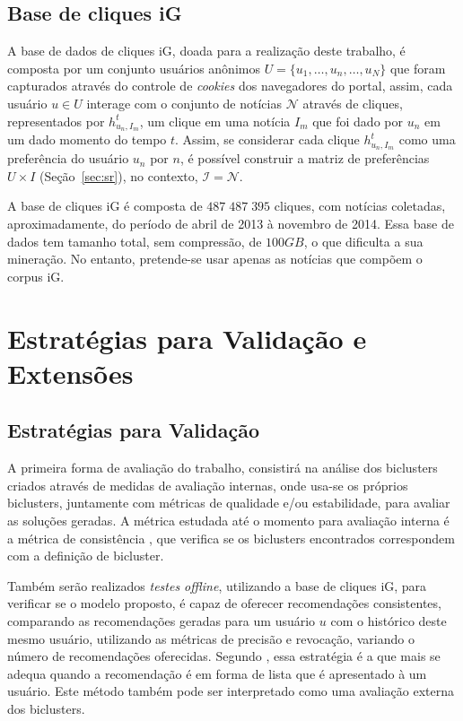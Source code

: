 \documentclass[
    12pt,                %
    oneside,            %
    a4paper,            %
    english,            %
    brazil                %
    ]{abntex2ppgsi}
\begin{document}
\subsection{Base de cliques iG}
\label{subsec:basecliquesig}

A base de dados de cliques iG, doada para a realização deste trabalho, é composta por um conjunto usuários anônimos $U = \{ u_1, \dots, u_n, \dots, u_N \}$ que foram capturados através do controle de \textit{cookies} dos navegadores do portal, assim, cada usuário $u \in U$ interage com o conjunto de notícias $\mathcal{N}$ através de cliques, representados por $h_{u_n,I_m}^t$, um clique em uma notícia $I_m$ que foi dado por $u_n$ em um dado momento do tempo $t$.
Assim, se considerar cada clique $h_{u_n,I_m}^t$ como uma preferência do usuário $u_n$ por $n$, é possível construir a matriz de preferências $U \times I$ (Seção~\ref{sec:sr}), no contexto, $\mathcal{I} = \mathcal{N}$.

A base de cliques iG é composta de $487\;487\;395$ cliques, com notícias coletadas, aproximadamente, do período de abril de 2013 à novembro de 2014. Essa base de dados tem tamanho total, sem compressão, de $100GB$, o que dificulta a sua mineração. No entanto, pretende-se usar apenas as notícias que compõem o corpus iG.


\section{Estratégias para Validação e Extensões}
\label{sec:estrategiasvalidacao}

\subsection{Estratégias para Validação}

A primeira forma de avaliação do trabalho, consistirá na análise dos biclusters criados através de medidas de avaliação internas, onde usa-se os próprios biclusters, juntamente com métricas de qualidade e/ou estabilidade, para avaliar as soluções geradas.
A métrica estudada até o momento para avaliação interna é a métrica de consistência \cite{Santamaria2007}, que verifica se os biclusters encontrados correspondem com a definição de bicluster.

Também serão realizados \textit{testes offline}, utilizando a base de cliques iG, para verificar se o modelo proposto, é capaz de oferecer recomendações consistentes, comparando as recomendações geradas para um usuário $u$ com o histórico deste mesmo usuário, utilizando as métricas de precisão e revocação, variando o número de recomendações oferecidas.
Segundo , essa estratégia é a que mais se adequa quando a recomendação é em forma de lista que é apresentado à um usuário.
Este método também pode ser interpretado como uma avaliação externa dos biclusters.
\end{document}
